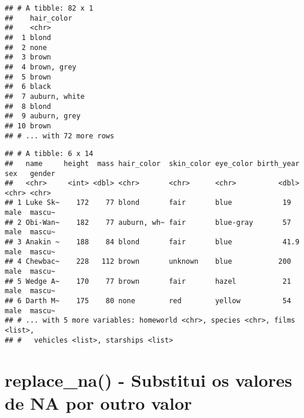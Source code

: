 \documentclass[]{book}
\newenvironment{Shaded}{\begin{snugshade}}{\end{snugshade}}
\newcommand{\DataTypeTok}[1]{\textcolor[rgb]{0.13,0.29,0.53}{#1}}
\newcommand{\KeywordTok}[1]{\textcolor[rgb]{0.13,0.29,0.53}{\textbf{#1}}}
\newcommand{\NormalTok}[1]{#1}
\newcommand{\OperatorTok}[1]{\textcolor[rgb]{0.81,0.36,0.00}{\textbf{#1}}}
\newcommand{\StringTok}[1]{\textcolor[rgb]{0.31,0.60,0.02}{#1}}
\begin{document}
\begin{verbatim}
## # A tibble: 82 x 1
##    hair_color   
##    <chr>        
##  1 blond        
##  2 none         
##  3 brown        
##  4 brown, grey  
##  5 brown        
##  6 black        
##  7 auburn, white
##  8 blond        
##  9 auburn, grey 
## 10 brown        
## # ... with 72 more rows
\end{verbatim}

\begin{Shaded}
\end{Shaded}

\begin{verbatim}
## # A tibble: 6 x 14
##   name     height  mass hair_color  skin_color eye_color birth_year sex   gender
##   <chr>     <int> <dbl> <chr>       <chr>      <chr>          <dbl> <chr> <chr> 
## 1 Luke Sk~    172    77 blond       fair       blue            19   male  mascu~
## 2 Obi-Wan~    182    77 auburn, wh~ fair       blue-gray       57   male  mascu~
## 3 Anakin ~    188    84 blond       fair       blue            41.9 male  mascu~
## 4 Chewbac~    228   112 brown       unknown    blue           200   male  mascu~
## 5 Wedge A~    170    77 brown       fair       hazel           21   male  mascu~
## 6 Darth M~    175    80 none        red        yellow          54   male  mascu~
## # ... with 5 more variables: homeworld <chr>, species <chr>, films <list>,
## #   vehicles <list>, starships <list>
\end{verbatim}

\hypertarget{replace_na---substitui-os-valores-de-na-por-outro-valor}{%
\section{replace\_na() - Substitui os valores de NA por outro valor}\label{replace_na---substitui-os-valores-de-na-por-outro-valor}}

\begin{Shaded}
\end{Shaded}
\end{document}
